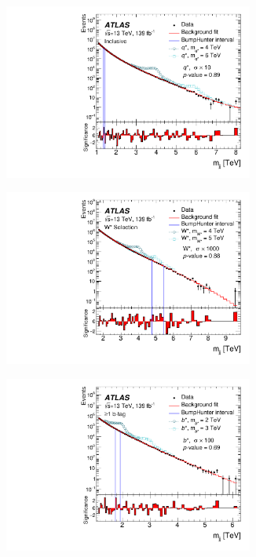 \begin{figure}[htbp]
  \begin{subfigure}{.5\textwidth}
  \centering
  \includegraphics[width=0.9\textwidth]{figs/fig_03a.pdf}
  \caption{}
  \end{subfigure}
  \begin{subfigure}{.5\textwidth}
  \centering
  \includegraphics[width=0.9\textwidth]{figs/fig_03b.pdf}
  \caption{}
  \end{subfigure}
\newline
  \begin{subfigure}{.5\textwidth}
  \centering
  \includegraphics[width=0.9\textwidth]{figs/fig_03c.pdf}

\end{subfigure}
\end{figure}
